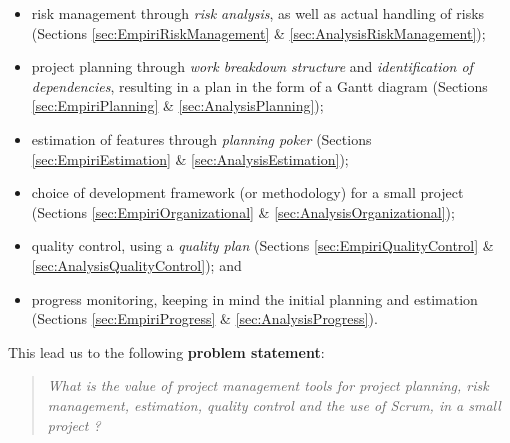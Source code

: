 \begin{itemize} \item risk management through \emph{risk analysis}, as well as
		actual handling of risks (Sections
	\ref{sec:EmpiriRiskManagement} \& \ref{sec:AnalysisRiskManagement});
	\item project planning through \emph{work breakdown structure} and
		\emph{identification of dependencies}, resulting in a plan in
	the form of a Gantt diagram (Sections \ref{sec:EmpiriPlanning} \&
	\ref{sec:AnalysisPlanning}); \item estimation of features through
		\emph{planning poker} (Sections \ref{sec:EmpiriEstimation} \&
		\ref{sec:AnalysisEstimation}); \item choice of development
		framework (or methodology) for a small project (Sections
	\ref{sec:EmpiriOrganizational} \& \ref{sec:AnalysisOrganizational});
	\item quality control, using a \emph{quality plan} (Sections
		\ref{sec:EmpiriQualityControl} \&
		\ref{sec:AnalysisQualityControl}); and \item progress
	monitoring, keeping in mind the initial planning and estimation
	(Sections \ref{sec:EmpiriProgress} \& \ref{sec:AnalysisProgress}).
\end{itemize}

This lead us to the following \textbf{problem statement}:
\begin{quote}
\emph{
What is the value of project management tools for project planning, risk management, estimation, quality control and the use of Scrum, in a small project ?
}
\end{quote}
